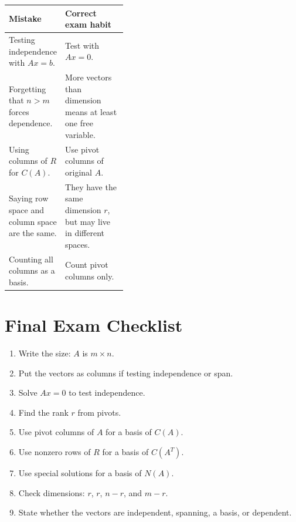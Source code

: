 \documentclass[10pt]{article}
\begin{document}
\begin{center}
\small
\begin{tabularx}{\linewidth}{@{}L{0.40\linewidth}Y@{}}
\toprule
Mistake & Correct exam habit \\
\midrule
Testing independence with \(Ax=b\). & Test with \(Ax=0\). \\
Forgetting that \(n>m\) forces dependence. & More vectors than dimension means at least one free variable. \\
Using columns of \(R\) for \(C(A)\). & Use pivot columns of original \(A\). \\
Saying row space and column space are the same. & They have the same dimension \(r\), but may live in different spaces. \\
Counting all columns as a basis. & Count pivot columns only. \\
\bottomrule
\end{tabularx}
\end{center}

\section{Final Exam Checklist}

\begin{enumerate}
  \item Write the size: \(A\) is \(m\times n\).
  \item Put the vectors as columns if testing independence or span.
  \item Solve \(Ax=0\) to test independence.
  \item Find the rank \(r\) from pivots.
  \item Use pivot columns of \(A\) for a basis of \(C(A)\).
  \item Use nonzero rows of \(R\) for a basis of \(C(A^{T})\).
  \item Use special solutions for a basis of \(N(A)\).
  \item Check dimensions: \(r\), \(r\), \(n-r\), and \(m-r\).
  \item State whether the vectors are independent, spanning, a basis, or dependent.
\end{enumerate}
\end{document}
